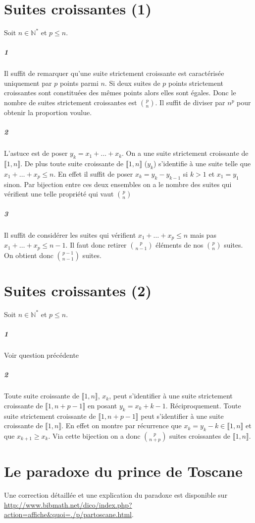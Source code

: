 \documentclass[10pt,a4paper]{article}
\begin{document}
\section{Suites croissantes (1)}
Soit $n \in \mathbb{N}^*$ et $p \le n$.
\subparagraph{1}Il suffit de remarquer qu'une suite strictement croissante est caractérisée uniquement par $p$ points parmi $n$. Si deux suites de $p$ points strictement croissantes sont constituées des mêmes points alors elles sont égales. Donc le nombre de suites strictement croissantes est $\binom{p}{n}$. Il suffit de diviser par $n^p$ pour obtenir la proportion voulue.
\subparagraph{2}L'astuce est de poser $y_k = x_1 + \dots + x_k$. On a une suite strictement croissante de $\llbracket 1,n \rrbracket$. De plus toute suite croissante de $\llbracket 1,n \rrbracket$ ($y_k$) s'identifie à une suite telle que $x_1+ \dots +x_p \le n$. En effet il suffit de poser $x_k = y_k - y_{k-1}$ si $k>1$ et $x_1 = y_1$ sinon. Par bijection entre ces deux ensembles on a le nombre des suites qui vérifient une telle propriété qui vaut $\binom{p}{n}$
\subparagraph{3}Il suffit de considérer les suites qui vérifient $x_1+ \dots +x_p \le n$ mais pas $x_1+ \dots +x_p \le n-1$. Il faut donc retirer $\binom{p}{n-1}$ éléments de nos $\binom{p}{n}$ suites. On obtient donc $\binom{p-1}{n-1}$ suites.

\section{Suites croissantes (2)}
Soit $n \in \mathbb{N}^*$ et $p \le n$.
\subparagraph{1}Voir question précédente
\subparagraph{2} Toute suite croissante de $\llbracket 1,n \rrbracket$, $x_k$, peut s'identifier à une suite strictement croissante de $\llbracket 1,n+p-1 \rrbracket$ en posant $y_k = x_k+k-1$. Réciproquement. Toute suite strictement croissante de $\llbracket 1,n+p-1 \rrbracket$ peut s'identifier à une suite croissante de $\llbracket 1, n \rrbracket$. En effet on montre par récurrence que $x_k = y_k -k \in \llbracket 1,n \rrbracket$ et que $x_{k+1} \ge x_k$. Via cette bijection on a donc $\binom{p}{n+p}$ suites croissantes de $\llbracket 1,n \rrbracket$. 

\section{Le paradoxe du prince de Toscane}
Une correction détaillée et une explication du paradoxe est disponible sur \url{http://www.bibmath.net/dico/index.php?action=affiche&quoi=./p/partoscane.html}.
\end{document}
